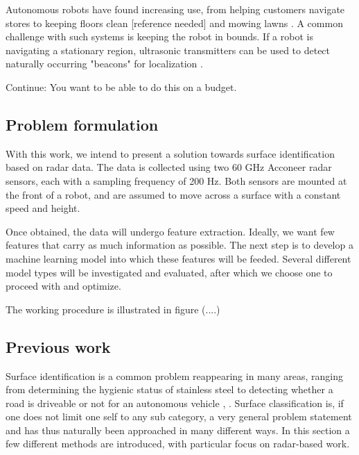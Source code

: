 Autonomous robots have found increasing use, from helping customers navigate stores \citep{mcsweeney_2018} to keeping floors clean [reference needed] and mowing lawns \citep{udelhofen_2018}. A common challenge with such systems is keeping the robot in bounds. If a robot is navigating a stationary region, ultrasonic transmitters can be used to detect naturally occurring "beacons" for localization \citep{leonard_durrant-whyte_1991}.

Continue: You want to be able to do this on a budget.

\subsection{Problem formulation}
With this work, we intend to present a solution towards surface identification based on radar data. The data is collected using two 60 GHz Acconeer radar sensors, each with a sampling frequency of 200 Hz. Both sensors are mounted at the front of a robot, and are assumed to move across a surface with a constant speed and height.

Once obtained, the data will undergo feature extraction. Ideally, we want few features that carry as much information as possible. The next step is to develop a machine learning model into which these features will be feeded. Several different model types will be investigated and evaluated, after which we choose one to proceed with and optimize. 

The working procedure is illustrated in figure (....)



\subsection{Previous work}

Surface identification is a common problem reappearing in many areas, ranging from determining the hygienic status of stainless steel \citep{jullien_bénézech_carpentier_lebret_faille_2003} to detecting whether a road is driveable or not for an autonomous vehicle \citep{guo_gerasimov_poulton_2006}, \citep{bystrov_2016}. Surface classification is, if one does not limit one self to any sub category, a very general problem statement and has thus naturally been approached in many different ways. In this section a few different methods are introduced, with particular focus on radar-based work. 

